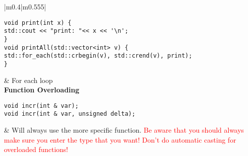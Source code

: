\documentclass[main.tex,fontsize=8pt,paper=a4,paper=portrait,DIV=calc]{scrartcl}
\begin{document}
\begin{table}[h!]
\begin{tabular}{|m{0.4\linewidth}|m{0.555\linewidth}|}
\hline
\begin{lstlisting}
void print(int x) {
std::cout << "print: "<< x << '\n';
}
void printAll(std::vector<int> v) {
std::for_each(std::crbegin(v), std::crend(v), print);
}
\end{lstlisting}
& For each loop\\
\hline
\textbf{Function Overloading}\newline
\begin{lstlisting}
void incr(int & var);
void incr(int & var, unsigned delta);
\end{lstlisting}
& Will always use the more specific function.\newline
\textcolor{red}{Be aware that you should always make sure you enter the type that you want!\newline
Don't do automatic casting for overloaded functions!}\\
\hline
\end{tabular}
\end{table}
\pagebreak
\end{document}
